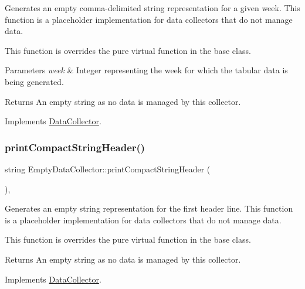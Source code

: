 Generates an empty comma-\/delimited string representation for a given week. This function is a placeholder implementation for data collectors that do not manage data. 

This function is overrides the pure virtual function in the base class.


\begin{DoxyParams}{Parameters}
{\em week} & Integer representing the week for which the tabular data is being generated.\\
\hline
\end{DoxyParams}
\begin{DoxyReturn}{Returns}
An empty string as no data is managed by this collector. 
\end{DoxyReturn}


Implements \mbox{\hyperlink{classDataCollector_a2eac264fa5612aed5a830b12de4f4ae3}{Data\+Collector}}.

\mbox{\label{classEmptyDataCollector_a345d478e92af2ab4bcbaeeae3c7a3faa}} 
\subsubsection{\texorpdfstring{print\+Compact\+String\+Header()}{printCompactStringHeader()}}
{\footnotesize\ttfamily string Empty\+Data\+Collector\+::print\+Compact\+String\+Header (\begin{DoxyParamCaption}{ }\end{DoxyParamCaption})\hspace{0.3cm}{\ttfamily [override]}, {\ttfamily [virtual]}}



Generates an empty string representation for the first header line. This function is a placeholder implementation for data collectors that do not manage data. 

This function is overrides the pure virtual function in the base class.

\begin{DoxyReturn}{Returns}
An empty string as no data is managed by this collector. 
\end{DoxyReturn}


Implements \mbox{\hyperlink{classDataCollector_a98dcb4ec871d9c7fbf7545c64e5ccc67}{Data\+Collector}}.

